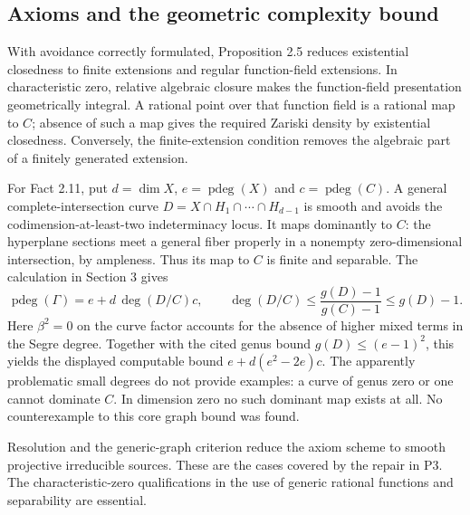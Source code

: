 \documentclass[10pt]{article}
\begin{document}
\subsection*{Axioms and the geometric complexity bound}
With avoidance correctly formulated, Proposition 2.5 reduces existential closedness to finite extensions and regular function-field extensions. In characteristic zero, relative algebraic closure makes the function-field presentation geometrically integral. A rational point over that function field is a rational map to \(C\); absence of such a map gives the required Zariski density by existential closedness. Conversely, the finite-extension condition removes the algebraic part of a finitely generated extension.\par
For Fact 2.11, put \(d=\dim X\), \(e=\operatorname{pdeg}(X)\) and \(c=\operatorname{pdeg}(C)\). A general complete-intersection curve \(D=X\cap H_1\cap\cdots\cap H_{d-1}\) is smooth and avoids the codimension-at-least-two indeterminacy locus. It maps dominantly to \(C\): the hyperplane sections meet a general fiber properly in a nonempty zero-dimensional intersection, by ampleness. Thus its map to \(C\) is finite and separable. The calculation in Section 3 gives \[\operatorname{pdeg}(\Gamma)=e+d\,\deg(D/C)c,\qquad
       \deg(D/C)\le\frac{g(D)-1}{g(C)-1}\le g(D)-1.\] Here \(\beta^2=0\) on the curve factor accounts for the absence of higher mixed terms in the Segre degree. Together with the cited genus bound \(g(D)\le(e-1)^2\), this yields the displayed computable bound \(e+d(e^2-2e)c\). The apparently problematic small degrees do not provide examples: a curve of genus zero or one cannot dominate \(C\). In dimension zero no such dominant map exists at all. No counterexample to this core graph bound was found.\par
Resolution and the generic-graph criterion reduce the axiom scheme to smooth projective irreducible sources. These are the cases covered by the repair in P3. The characteristic-zero qualifications in the use of generic rational functions and separability are essential.\par
\end{document}
